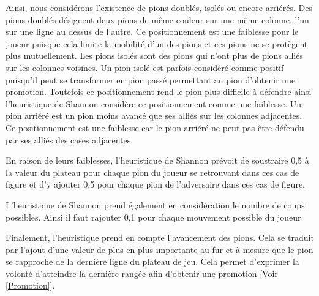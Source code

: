 \huge\documentclass{article}
\begin{document}
Ainsi, nous considérons l'existence de pions doublés, isolés ou encore arriérés.
\newline
Des pions doublés désignent deux pions de même couleur sur une même colonne, l'un sur une ligne au dessus de l'autre. Ce positionnement est une faiblesse pour le joueur puisque cela limite la mobilité d'un des pions et ces pions ne se protègent plus mutuellement.
\newline
Les pions isolés sont des pions qui n'ont plus de pions alliés sur les colonnes voisines. Un pion isolé est parfois considéré comme positif puisqu'il peut se transformer en pion passé permettant au pion d'obtenir une promotion. Toutefois ce positionnement rend le pion plus difficile à défendre ainsi l'heuristique de Shannon considère ce positionnement comme une faiblesse.
\newline
Un pion arriéré est un pion moins avancé que ses alliés sur les colonnes adjacentes. Ce positionnement est une faiblesse car le pion arriéré ne peut pas être défendu par ses alliés des cases adjacentes.

En raison de leurs faiblesses, l'heuristique de Shannon prévoit de soustraire 0,5 à la valeur du plateau pour chaque pion du joueur se retrouvant dans ces cas de figure et d'y ajouter 0,5 pour chaque pion de l'adversaire dans ces cas de figure.
\newline

L'heuristique de Shannon prend également en considération le nombre de coups possibles. Ainsi il faut rajouter 0,1 pour chaque mouvement possible du joueur.
\newline

Finalement, l'heuristique prend en compte l'avancement des pions. Cela se traduit par l'ajout d'une valeur de plus en plus importante au fur et à mesure que le pion se rapproche de la dernière ligne du plateau de jeu. Cela permet d'exprimer la volonté d'atteindre la dernière rangée afin d'obtenir une promotion [Voir \ref{Promotion}].
\end{document}
